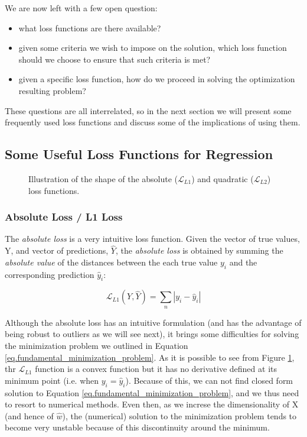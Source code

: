 We are now left with a few open question:
\begin{itemize}
\item what loss functions are there available?
\item given some criteria we wish to impose on the solution, which loss function should we choose to ensure that such criteria is met? 
\item given a specific loss function, how do we proceed in solving the optimization resulting problem?
\end{itemize}
These questions are all interrelated, so in the next section we will present some frequently used loss functions and discuss some of the implications of using them.

\subsection{Some Useful Loss Functions for Regression}

\begin {figure}[H]
\begin{center}
  
\end{center}
\caption{Illustration of the shape of the absolute ($\mathcal{L}_{L1}$) and quadratic ($\mathcal{L}_{L2}$) loss functions.}
\label{fig.loss_functions}
\end {figure}

\subsubsection{Absolute Loss / L1 Loss}
The \emph{absolute loss} is a very intuitive loss function. Given the vector of true values, Y, and vector of predictions, $\hat{Y}$, the \emph{absolute loss} is obtained by summing the \emph{absolute value} of the distances between the each true value $y_i$ and the corresponding prediction $\hat{y}_i$:

\begin{equation}
\mathcal{L}_{L1}(Y, \hat{Y}) = \sum_n | y_i - \hat{y}_i |
\end{equation}

Although the absolute loss has an intuitive formulation (and has the advantage of being robust to outliers as we will see  next), it brings some difficulties for solving the minimization problem we outlined in Equation \ref{eq.fundamental_minimization_problem}. As it is possible to see from Figure \ref{fig.loss_functions}, thr $\mathcal{L}_{L1}$ function is a convex function but it has no derivative defined at its minimum point (i.e. when $ y_i = \hat{y}_i$). Because of this, we can not find closed form solution to Equation \ref{eq.fundamental_minimization_problem}, and we thus need to resort to numerical methods. Even then, as we increse the dimensionality of X (and hence of $\hat{w}$), the (numerical) solution to the minimization problem tends to become very unstable because of this discontinuity around the minimum.

